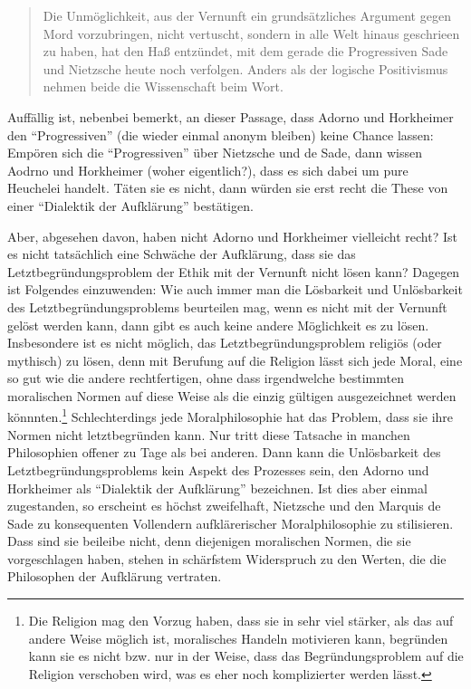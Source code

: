 \documentclass[12pt,a4paper,ngerman]{article}
\begin{document}
\begin{quotation}

Die Unmöglichkeit, aus der Vernunft ein grundsätzliches Argument gegen Mord
vorzubringen, nicht vertuscht, sondern in alle Welt hinaus geschrieen zu
haben, hat den Haß entzündet, mit dem gerade die Progressiven Sade und
Nietzsche heute noch verfolgen. Anders als der logische Positivismus nehmen
beide die Wissenschaft beim Wort. \cite[S. 127]{adorno-horkheimer:1947}

\end{quotation} 

Auffällig ist, nebenbei bemerkt, an dieser Passage, dass Adorno und
Horkheimer den "`Progressiven"' (die wieder einmal anonym bleiben)
keine Chance lassen: Empören sich die "`Progressiven"' über Nietzsche
und de Sade, dann wissen Aodrno und Horkheimer (woher eigentlich?),
dass es sich dabei um pure Heuchelei handelt. Täten sie es nicht, dann
würden sie erst recht die These von einer "`Dialektik der Aufklärung"'
bestätigen. 

Aber, abgesehen davon, haben nicht Adorno und Horkheimer
vielleicht recht? Ist es nicht tatsächlich eine Schwäche der
Aufklärung, dass sie das Letztbegründungsproblem der Ethik mit der
Vernunft nicht lösen kann? Dagegen ist Folgendes einzuwenden: Wie auch
immer man die Lösbarkeit und Unlösbarkeit des Letztbegründungsproblems
beurteilen mag, wenn es nicht mit der Vernunft gelöst werden kann,
dann gibt es auch keine andere Möglichkeit es zu lösen. Insbesondere
ist es nicht möglich, das Letztbegründungsproblem religiös (oder
mythisch) zu lösen, denn mit Berufung auf die Religion lässt sich jede
Moral, eine so gut wie die andere rechtfertigen, ohne dass
irgendwelche bestimmten moralischen Normen auf diese Weise als die
einzig gültigen ausgezeichnet werden könnnten.\footnote{Die Religion
mag den Vorzug haben, dass sie in sehr viel stärker, als das auf
andere Weise möglich ist, moralisches Handeln motivieren kann,
begründen kann sie es nicht bzw. nur in der Weise, dass das
Begründungsproblem auf die Religion verschoben wird, was es eher noch
komplizierter werden lässt.}  Schlechterdings jede Moralphilosophie
hat das Problem, dass sie ihre Normen nicht letztbegründen kann. Nur
tritt diese Tatsache in manchen Philosophien offener zu Tage als bei
anderen. Dann kann die Unlösbarkeit des Letztbegründungsproblems kein
Aspekt des Prozesses sein, den Adorno und Horkheimer als "`Dialektik
der Aufklärung"' bezeichnen. Ist dies aber einmal zugestanden, so
erscheint es höchst zweifelhaft, Nietzsche und den Marquis de Sade zu
konsequenten Vollendern aufklärerischer Moralphilosophie zu
stilisieren. Dass sind sie beileibe nicht, denn diejenigen moralischen
Normen, die sie vorgeschlagen haben, stehen in schärfstem Widerspruch
zu den Werten, die die Philosophen der Aufklärung vertraten. 
\end{document}
